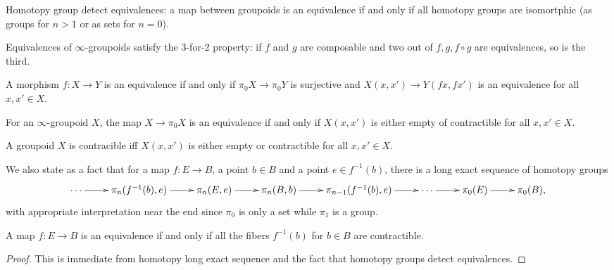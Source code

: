 Homotopy group detect equivalences:
a map between groupoids is an equivalence
if and only if all homotopy groups
are isomortphic (as groups for $n>1$ or
as sets for $n=0$).

\begin{lemma}
\label{lemma-equivalences-satisfy-2-for-3}
Equivalences of $\infty$-groupoids
satisfy the 3-for-2 property:
if  $f$ and $g$ are composable and two
out of $f,g,f \circ g$ are equivalences,
so is the third.
\end{lemma}

\begin{lemma}
\label{lemma-equivalence-iff-equivalence-on-path-spaces}
A morphism $f:X\to Y$ is an equivalence if and only if
$\pi_0 X \to \pi_0Y$ is surjective
and $X(x,x') \to Y(fx,fx')$ is an equivalence
for all $x,x' \in X$.
\end{lemma}

\begin{lemma}
\label{lemma-equivalence-iff-path-spaces-are-contractible}
For an  $\infty$-groupoid $X$,
the map $X \to \pi_0X$ is an equivalence if and only if
$X(x,x')$ is either empty of contractible for all $x,x' \in X$.
\end{lemma}

\begin{lemma}
\label{lemma-groupoid-is-contractible-iff-path-spaces-are-contractible}
A groupoid $X$ is contracible iff $X(x,x')$ is either empty or
contractible for all $x,x' \in X$.
\end{lemma}

\medskip\noindent
We also state as a fact that
for a map $f:E \to B$, a point $b \in B$ and a point $e \in f^{-1}(b)$,
there is a long exact sequence of homotopy groups
$$
\xymatrix{
\cdots\ar[r]&\pi_n(f^{-1}(b),e)\ar[r]&
\pi_n(E,e)\ar[r]&\pi_n(B,b)\ar[r]&
\pi_{n-1}(f^{-1}(b),e)\ar[r]&\cdots
\ar[r]&\pi_0(E)\ar[r]&\pi_0(B),
}
$$
with appropriate interpretation near the end since
$\pi_0$ is only a set while $\pi_1$ is a group.

\begin{proposition}
\label{proposition-map-is-equivalence-iff-fibers-contractible}
A map $f:E \to B$ is an equivalence if and only if
all the fibers $f^{-1}(b)$ for $b \in B$ are contractible.
\end{proposition}

\begin{proof}
This is immediate from homotopy long exact sequence
and the fact that homotopy groups detect equivalences.
\end{proof}

